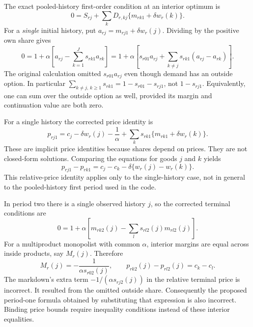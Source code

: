 \documentclass[12pt]{article}
\theoremstyle{definition}
\theoremstyle{remark}
\numberwithin{equation}{section}
\begin{document}
The exact pooled-history first-order condition at an interior optimum is
\[
 0=S_{rj}+\sum_kD_{r,kj}\{m_{rk1}+\delta w_r(k)\}.
\]
For a \emph{single} initial history, put $a_{rj}=m_{rj1}+\delta w_r(j)$.
Dividing by the positive own share gives
\[
 0=1+\alpha\left[a_{rj}-\sum_{k=1}^Js_{rk1}a_{rk}\right]
 =1+\alpha\left[s_{r01}a_{rj}
       +\sum_{k\ne j}s_{rk1}(a_{rj}-a_{rk})\right].
\]
The original calculation omitted $s_{r01}a_{rj}$ even though demand has an
outside option. In particular $\sum_{k\ne j,\,k\ge1}s_{rk1}=1-s_{r01}-s_{rj1}$,
not $1-s_{rj1}$. Equivalently, one can sum over the outside option as well,
provided its margin and continuation value are both zero.

For a single history the corrected price identity is
\[
 p_{rj1}=c_j-\delta w_r(j)-\frac{1}{\alpha}
             +\sum_ks_{rk1}\{m_{rk1}+\delta w_r(k)\}.
\]
These are implicit price identities because shares depend on prices. They are
not closed-form solutions. Comparing the equations for goods $j$ and $k$ yields
\[
 p_{rj1}-p_{rk1}=c_j-c_k-\delta\{w_r(j)-w_r(k)\}.
\]
This relative-price identity applies only to the single-history case, not in
general to the pooled-history first period used in the code.

In period two there is a single observed history $j$, so the corrected
terminal conditions are
\[
 0=1+\alpha\left[m_{rk2}(j)-\sum_ls_{rl2}(j)m_{rl2}(j)\right].
\]
For a multiproduct monopolist with common $\alpha$, interior margins are equal
across inside products, say $M_r(j)$. Therefore
\[
 M_r(j)=-\frac{1}{\alpha s_{r02}(j)},\qquad
 p_{rk2}(j)-p_{rl2}(j)=c_k-c_l.
\]
The markdown's extra term $-1/(\alpha s_{rj2}(j))$ in the relative terminal
price is incorrect. It resulted from the omitted outside share. Consequently
the proposed period-one formula obtained by substituting that expression is
also incorrect. Binding price bounds require inequality conditions instead of
these interior equalities.
\end{document}
